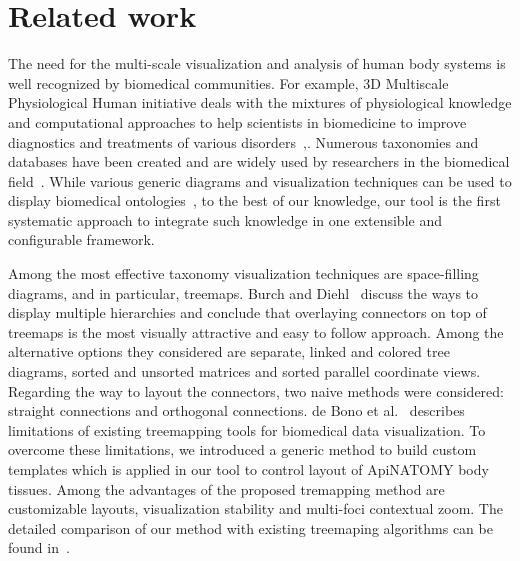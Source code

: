\section{Related work}
\label{sect:relatedWork}

The need for the multi-scale visualization and analysis of human body systems is well recognized by biomedical communities. For example,
3D Multiscale Physiological Human initiative deals with the mixtures of physiological knowledge and computational approaches to help scientists in biomedicine to improve diagnostics and treatments of various disorders~\cite{MRC09},\cite{Mag09}.
Numerous taxonomies and databases have been created and are widely used by researchers in the biomedical field~\cite{BDB08}.
While various generic diagrams and visualization techniques can be used to display biomedical ontologies~\cite{KHL+07}, to the best of our knowledge, our tool is the first systematic approach to integrate such knowledge in one extensible and configurable framework.

Among the most effective taxonomy visualization techniques are space-filling diagrams, and in particular, treemaps.
Burch and Diehl~\cite{BD06} discuss the ways to display multiple hierarchies and conclude that overlaying connectors on top of treemaps is the most visually attractive and easy to follow approach. Among the alternative options they considered are separate, linked and colored tree diagrams, sorted and unsorted matrices and sorted parallel coordinate views. Regarding the way to layout the connectors, two naive methods were considered: straight connections and orthogonal connections. de Bono et al.~\cite{BGS12} describes limitations of existing treemapping tools for biomedical data visualization. To overcome these limitations, we introduced a generic method to build custom templates which is applied in our tool to control layout of ApiNATOMY body tissues. Among the advantages of the proposed tremapping method are customizable layouts, visualization stability and multi-foci contextual zoom. The detailed comparison of our method with existing treemaping algorithms can be found in~\cite{KBK14}.

